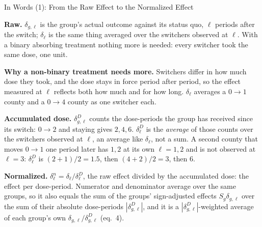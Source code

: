 \documentclass[main.tex]{subfiles}
\begin{document}
\begin{frame}{In Words (1): From the Raw Effect to the Normalized Effect}

  \footnotesize
  \textbf{Raw.} $\delta_{g,\ell}$ is the group's actual outcome against its
  status quo, $\ell$ periods after the switch; $\delta_\ell$ is the same
  thing averaged over the switchers observed at $\ell$. With a binary
  absorbing treatment nothing more is needed: every switcher took the same dose, one
  unit.

  \medskip
  \textbf{Why a non-binary treatment needs more.} Switchers differ in how much
  dose they took, and the dose stays in force period after period, so the
  effect measured at $\ell$ reflects both how much and for how long.
  $\delta_\ell$ averages a $0\!\to\!1$ county and a $0\!\to\!4$ county as one
  switcher each.

  \medskip
  \textbf{Accumulated dose.} $\delta^{D}_{g,\ell}$ counts the dose-periods the
  group has received since its switch: $0 \to 2$ and staying gives $2, 4, 6$.
  $\delta^{D}_\ell$ is the \emph{average} of those counts over the switchers
  observed at $\ell$, an average like $\delta_\ell$, not a sum. A second
  county that moves $0 \to 1$ one period later has $1, 2$ at its own
  $\ell = 1, 2$ and is not observed at $\ell = 3$: $\delta^{D}_\ell$ is
  $(2+1)/2 = 1.5$, then $(4+2)/2 = 3$, then $6$.

  \medskip
  \textbf{Normalized.} $\delta^{n}_\ell = \delta_\ell / \delta^{D}_\ell$, the
  raw effect divided by the accumulated dose: the effect per dose-period.
  Numerator and denominator average over the same groups, so it also equals
  the sum of the groups' sign-adjusted effects $S_g\delta_{g,\ell}$ over the
  sum of their absolute dose-periods $|\delta^{D}_{g,\ell}|$, and it is a
  $|\delta^{D}_{g,\ell}|$-weighted average of each group's own
  $\delta_{g,\ell} / \delta^{D}_{g,\ell}$ (eq.~4).

\end{frame}
\end{document}
